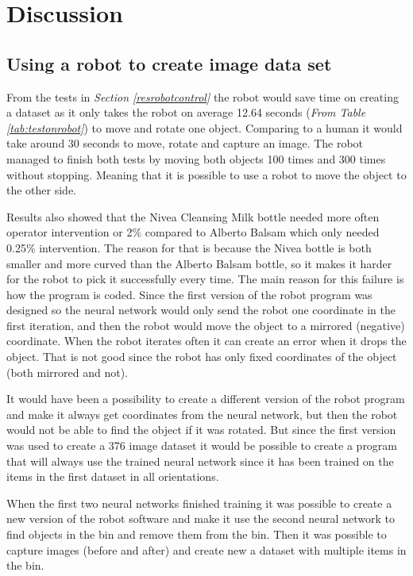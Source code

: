 \chapter{Discussion}

\section{Using a robot to create image data set}
From the tests in \textit{Section \ref{resrobotcontrol}} the robot would save time on creating a dataset as it only takes the robot on average 12.64 seconds (\textit{From Table \ref{tab:testonrobot}}) to move and rotate one object. Comparing to a human it would take around 30 seconds to move, rotate and capture an image. The robot managed to finish both tests by moving both objects 100 times and 300 times without stopping. Meaning that it is possible to use a robot to move the object to the other side. 

Results also showed that the Nivea Cleansing Milk bottle needed more often operator intervention or 2\% compared to Alberto Balsam which only needed 0.25\% intervention. The reason for that is because the Nivea bottle is both smaller and more curved than the Alberto Balsam bottle, so it makes it harder for the robot to pick it successfully every time. The main reason for this failure is how the program is coded. Since the first version of the robot program was designed so the neural network would only send the robot one coordinate in the first iteration, and then the robot would move the object to a mirrored (negative) coordinate. When the robot iterates often it can create an error when it drops the object. That is not good since the robot has only fixed coordinates of the object (both mirrored and not).

It would have been a possibility to create a different version of the robot program and make it always get coordinates from the neural network, but then the robot would not be able to find the object if it was rotated. But since the first version was used to create a 376 image dataset it would be possible to create a program that will always use the trained neural network since it has been trained on the items in the first dataset in all orientations.

When the first two neural networks finished training it was possible to create a new version of the robot software and make it use the second neural network to find objects in the bin and remove them from the bin. Then it was possible to capture images (before and after) and create new a dataset with multiple items in the bin.

